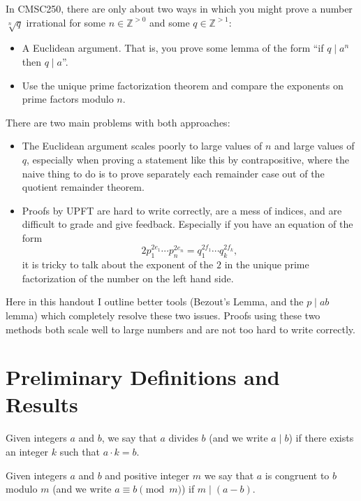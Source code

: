 In CMSC250, there are only about two ways in which you might prove a number $\sqrt[n]{q}$ irrational for some $n \in \mathbb{Z}^{>0}$ and some $q \in \mathbb{Z}^{>1}$:

\begin{itemize}
    \item A Euclidean argument. That is, you prove some lemma of the form ``if $q \mid a^n$ then $q \mid a$''.
    \item Use the unique prime factorization theorem and compare the exponents on prime factors modulo $n$.
\end{itemize}

There are two main problems with both approaches:
\begin{itemize}
    \item The Euclidean argument scales poorly to large values of $n$ and large values of $q$, especially when proving a statement like this by contrapositive, where the naive thing to do is to prove separately each remainder case out of the quotient remainder theorem.
    \item Proofs by UPFT are hard to write correctly, are a mess of indices, and are difficult to grade and give feedback. Especially if you have an equation of the form
    \[2p_1^{2e_1}\cdots p_n^{2e_n} = q_1^{2f_1}\cdots q_k^{2f_k},\]
    it is tricky to talk about the exponent of the $2$ in the unique prime factorization of the number on the left hand side.
\end{itemize}

Here in this handout I outline better tools (Bezout's Lemma, and the $p \mid ab$ lemma) which completely resolve these two issues. Proofs using these two methods both scale well to large numbers and are not too hard to write correctly.

\section{Preliminary Definitions and Results}

\begin{definition}
 Given integers $a$ and $b$, we say that $a$ divides $b$ (and we write $a \mid b$) if there exists an integer $k$ such that $a \cdot k = b$.
\end{definition}

\begin{definition}
 Given integers $a$ and $b$ and positive integer $m$ we say that $a$ is congruent to $b$ modulo $m$ (and we write $a \equiv b \pmod{m}$) if $m \mid (a - b)$.
\end{definition}

